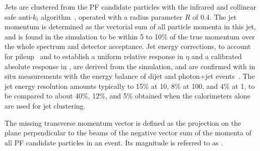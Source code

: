 Jets are clustered from the PF candidate particles with the infrared
and collinear safe anti-$k_t$ algorithm~\cite{antikt}, operated with a
radius parameter $R$ of 0.4. The jet momentum is determined as the
vectorial sum of all particle momenta in this jet, and is found in the
simulation to be within 5 to 10\% of the true momentum over the whole
\pt spectrum and detector acceptance. Jet energy corrections, to
account for pileup~\cite{pileup} and to establish a uniform relative
response in $\eta$ and a calibrated absolute response in \Pt, are
derived from the simulation, and are confirmed with in situ
measurements with the energy balance of dijet and photon+jet
events~\cite{Chatrchyan:2011ds}. The jet energy resolution amounts
typically to 15\% at 10\GeV, 8\% at 100\GeV, and 4\% at 1\TeV, to be
compared to about 40\%, 12\%, and 5\% obtained when the calorimeters
alone are used for jet clustering.

The missing transverse momentum vector \ptvecmiss is defined as the
projection on the plane perpendicular to the beams of the negative
vector sum of the momenta of all PF candidate particles in an event.
Its magnitude is referred to as \ETmiss.
